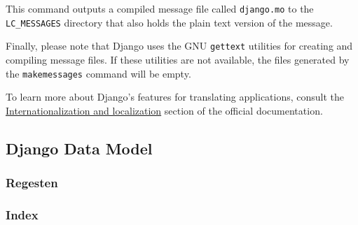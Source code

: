 This command outputs a compiled message file called \texttt{django.mo}
to the \texttt{LC\_MESSAGES} directory that also holds the plain text
version of the message.

Finally, please note that Django uses the GNU \texttt{gettext}
utilities for creating and compiling message files. If these utilities
are not available, the files generated by the \texttt{makemessages}
command will be empty.

To learn more about Django's features for translating applications,
consult the
\href{https://docs.djangoproject.com/en/1.4/topics/i18n/}{Internationalization
  and localization} section of the official documentation.

\subsection{Django Data Model}
\label{sec:data-model}

\subsubsection{Regesten}
\label{sec:reg-model}

\subsubsection{Index}
\label{sec:index-model}
